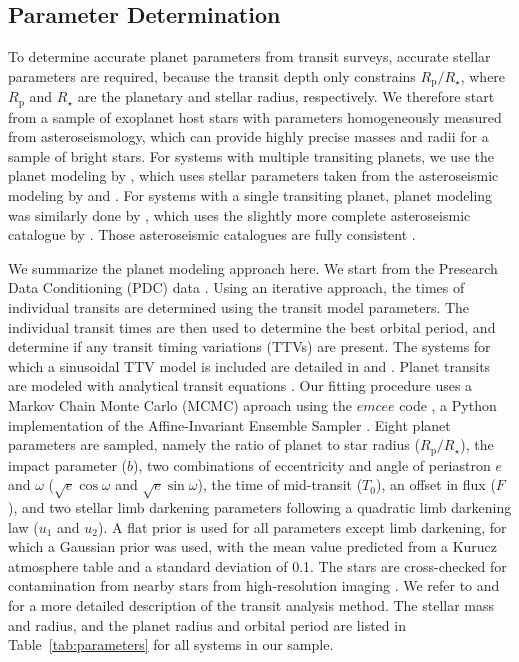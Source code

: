 \documentclass[a4paper,fleqn,usenatbib]{mnras}
\begin{document}
\subsection{Parameter Determination}
\label{sec:sample}

To determine accurate planet parameters from transit surveys, accurate stellar parameters are required, because the transit depth only constrains $R_\mathrm{p}/R_\star$, where $R_\mathrm{p}$ and $R_\star$ are the planetary and stellar radius, respectively. We therefore start from a sample of exoplanet host stars with parameters homogeneously measured from asteroseismology, which can provide highly precise masses and radii for a sample of bright stars. For systems with multiple transiting planets, we use the planet modeling by \cite{vaneylen2015}, which uses stellar parameters taken from the asteroseismic modeling by \cite{huber2013} and \cite{silvaaguirre2015}. For systems with a single transiting planet, planet modeling was similarly done by \cite{vaneylen2017}, which uses the slightly more complete asteroseismic catalogue by \cite{lundkvist2016}. Those asteroseismic catalogues are fully consistent \citep{lundkvist2016}. 

We summarize the planet modeling approach here. We start from the Presearch Data Conditioning (PDC) data \citep{smith2012}. Using an iterative approach, the times of individual transits are determined using the transit model parameters. The individual transit times are then used to determine the best orbital period, and determine if any transit timing variations (TTVs) are present. The systems for which a sinusoidal TTV model is included are detailed in \cite{vaneylen2015} and \cite{vaneylen2017}. Planet transits are modeled with analytical transit equations \citep{mandel2002}. Our fitting procedure uses a Markov Chain Monte Carlo (MCMC) aproach using the $emcee$ code \citep{foremanmackey2013}, a Python implementation of the Affine-Invariant Ensemble Sampler \citep{goodman2010}. Eight planet parameters are sampled, namely the ratio of planet to star radius ($R_\textrm{p}/R_\star$), the impact parameter ($b$), two combinations of eccentricity and angle of periastron $e$ and $\omega$ ($\sqrt{e}\cos \omega$ and $\sqrt{e} \sin \omega$), the time of mid-transit ($T_0$), an offset in flux ($F$), and two stellar limb darkening parameters following a quadratic limb darkening law ($u_1$ and $u_2$). A flat prior is used for all parameters except limb darkening, for which a Gaussian prior was used, with the mean value predicted from a Kurucz atmosphere table \citep{claret2011} and a standard deviation of 0.1. The stars are cross-checked for contamination from nearby stars from high-resolution imaging \citep[e.g.][]{furlan2017}. We refer to \cite{vaneylen2015} and \cite{vaneylen2017} for a more detailed description of the transit analysis method. The stellar mass and radius, and the planet radius and orbital period are listed in Table~\ref{tab:parameters} for all systems in our sample.
\end{document}
